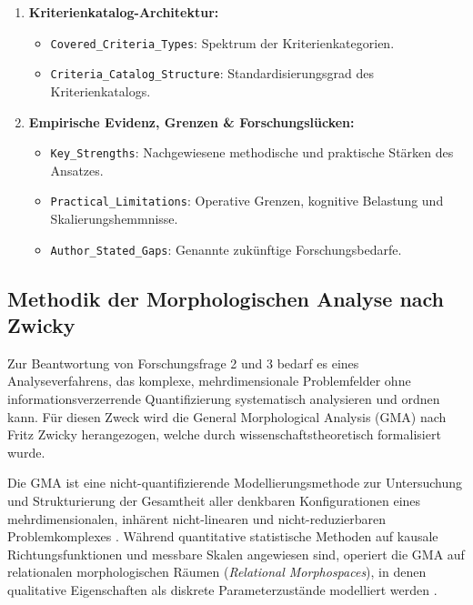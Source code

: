\begin{enumerate}[label=\textbf{Gruppe \Roman*:}, leftmargin=*]
\begin{itemize}[leftmargin=*]
    \item \texttt{Mismatch\_Handling\_Phase}: Selektionsphase der Mismatch-Behandlung.
  \end{itemize}
  \item \textbf{Kriterienkatalog-Architektur:}
  \begin{itemize}[leftmargin=*]
    \item \texttt{Covered\_Criteria\_Types}: Spektrum der Kriterienkategorien.
    \item \texttt{Criteria\_Catalog\_Structure}: Standardisierungsgrad des Kriterienkatalogs.
  \end{itemize}
  \item \textbf{Empirische Evidenz, Grenzen \& Forschungslücken:}
  \begin{itemize}[leftmargin=*]
    \item \texttt{Key\_Strengths}: Nachgewiesene methodische und praktische Stärken des Ansatzes.
    \item \texttt{Practical\_Limitations}: Operative Grenzen, kognitive Belastung und Skalierungshemmnisse.
    \item \texttt{Author\_Stated\_Gaps}: Genannte zukünftige Forschungsbedarfe.
  \end{itemize}
\end{enumerate}

\subsection{Methodik der Morphologischen Analyse nach Zwicky}
\label{subsec:morphologische_analyse_methodik}

Zur Beantwortung von Forschungsfrage 2 und 3 bedarf es eines Analyseverfahrens, das komplexe, mehrdimensionale Problemfelder ohne informationsverzerrende Quantifizierung systematisch analysieren und ordnen kann. Für diesen Zweck wird die General Morphological Analysis (GMA) nach Fritz Zwicky herangezogen, welche durch \textcite[S.~81 bis 91]{Z6N6V5L9} wissenschaftstheoretisch formalisiert wurde.

Die GMA ist eine nicht-quantifizierende Modellierungsmethode zur Untersuchung und Strukturierung der Gesamtheit aller denkbaren Konfigurationen eines mehrdimensionalen, inhärent nicht-linearen und nicht-reduzierbaren Problemkomplexes \parencite[S.~81 bis 82]{Z6N6V5L9}. Während quantitative statistische Methoden auf kausale Richtungsfunktionen und messbare Skalen angewiesen sind, operiert die GMA auf relationalen morphologischen Räumen (\textit{Relational Morphospaces}), in denen qualitative Eigenschaften als diskrete Parameterzustände modelliert werden \parencite[S.~83 bis 85]{Z6N6V5L9}.

